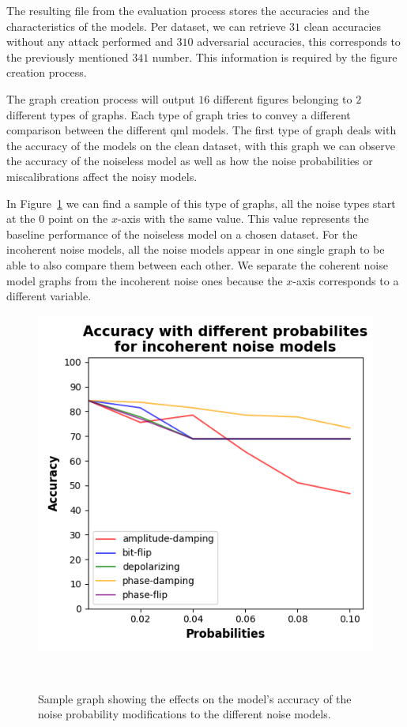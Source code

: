 The resulting file from the evaluation process stores the
accuracies and the characteristics of the models. Per dataset,
we can retrieve \(31\) clean accuracies without any attack
performed and \(310\) adversarial accuracies, this corresponds
to the previously mentioned \(341\) number. This information
is required by the figure creation process. \

The graph creation process will output \(16\) different
figures belonging to \(2\) different types of graphs. Each
type of graph tries to convey a different comparison between
the different \ac{qml} models. The first type of graph deals
with the accuracy of the models on the clean dataset, 
with this graph we can observe the accuracy of the noiseless
model as well as how the noise probabilities or miscalibrations
affect the noisy models. \

In Figure~\ref{fig:sample-accuracy} we
can find a sample of this type of graphs, all the noise types
start at the \(0\) point on the \(x\)-axis with the same value. This
value represents the baseline performance of the noiseless model
on a chosen dataset. For the incoherent noise models, all the
noise models appear in one single graph to be able to also compare
them between each other. We separate the coherent noise model graphs
from the incoherent noise ones because the \(x\)-axis corresponds to
a different variable. \

\begin{figure}[h!]
  \includegraphics[scale=0.70]{figures/accuracy-graph.png}
  \centering
  \caption{Sample graph showing the effects on the model's accuracy of the noise probability modifications to the different noise models.}
~\label{fig:sample-accuracy}
\end{figure} \

